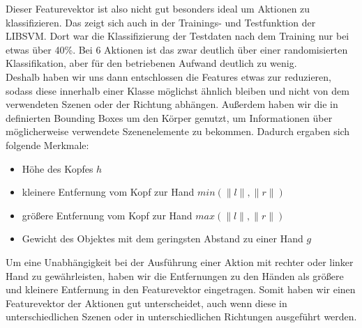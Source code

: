 Dieser Featurevektor ist also nicht gut besonders ideal um Aktionen zu klassifizieren. Das zeigt sich auch in der Trainings- und Testfunktion der LIBSVM. Dort war die Klassifizierung der Testdaten nach dem Training nur bei etwas über 40\%. Bei 6 Aktionen ist das zwar deutlich über einer randomisierten Klassifikation, aber für den betriebenen Aufwand deutlich zu wenig.\\
Deshalb haben wir uns dann entschlossen die Features etwas zur reduzieren, sodass diese innerhalb einer Klasse möglichst ähnlich bleiben und nicht von dem verwendeten Szenen oder der Richtung abhängen. Außerdem haben wir die in \cite{scene-grok} definierten Bounding Boxes um den Körper genutzt, um Informationen über möglicherweise verwendete Szenenelemente zu bekommen. Dadurch ergaben sich folgende Merkmale:
\begin{itemize}
    \item Höhe des Kopfes $h$
    \item kleinere Entfernung vom Kopf zur Hand $min(\lVert l \rVert,\lVert r \rVert)$
    \item größere Entfernung vom Kopf zur Hand $max(\lVert l \rVert,\lVert r \rVert)$
    \item Gewicht des Objektes mit dem geringsten Abstand zu einer Hand $g$
\end{itemize}
Um eine Unabhängigkeit bei der Ausführung einer Aktion mit rechter oder linker Hand zu gewährleisten, haben wir die Entfernungen zu den Händen als größere und kleinere Entfernung in den Featurevektor eingetragen. Somit haben wir einen Featurevektor der Aktionen gut unterscheidet, auch wenn diese in unterschiedlichen Szenen oder in unterschiedlichen Richtungen ausgeführt werden.

